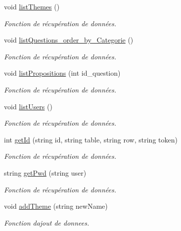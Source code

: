 \begin{DoxyCompactItemize}
void \mbox{\hyperlink{classDatabase_a725966780835e8a3c1315fbdce50258f}{list\+Themes}} ()
\begin{DoxyCompactList}\small\item\em Fonction de récupération de données. \end{DoxyCompactList}\item 
void \mbox{\hyperlink{classDatabase_ae5bacbdc2d6804c63d79cdafc249dd64}{list\+Questions\+\_\+order\+\_\+by\+\_\+\+Categorie}} ()
\begin{DoxyCompactList}\small\item\em Fonction de récupération de données. \end{DoxyCompactList}\item 
void \mbox{\hyperlink{classDatabase_a184cd88b6dfcc3938b699107b693d642}{list\+Propositions}} (int id\+\_\+question)
\begin{DoxyCompactList}\small\item\em Fonction de récupération de données. \end{DoxyCompactList}\item 
void \mbox{\hyperlink{classDatabase_adf142a6306d28877edca6de39a4b7bc1}{list\+Users}} ()
\begin{DoxyCompactList}\small\item\em Fonction de récupération de données. \end{DoxyCompactList}\item 
int \mbox{\hyperlink{classDatabase_a4b452a64336f21e9ff02495c6f52b0fc}{get\+Id}} (string id, string table, string row, string token)
\begin{DoxyCompactList}\small\item\em Fonction de récupération de données. \end{DoxyCompactList}\item 
string \mbox{\hyperlink{classDatabase_aa521990114ae753ab5cea9b7ebf3ca01}{get\+Pwd}} (string user)
\begin{DoxyCompactList}\small\item\em Fonction de récupération de données. \end{DoxyCompactList}\item 
void \mbox{\hyperlink{classDatabase_a15faf1f7341da9efee62afacd31fb81d}{add\+Theme}} (string new\+Name)
\begin{DoxyCompactList}\small\item\em Fonction d\textquotesingle{}ajout de donnees. \end{DoxyCompactList}\item 

\end{DoxyCompactItemize}
